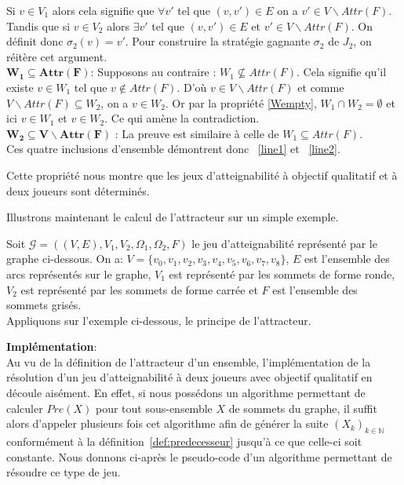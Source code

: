 \begin{demonstration}
		Si $v \in V_1$ alors cela signifie que $\forall v'$ tel que $(v,v') \in E$ on a $v' \in V\backslash Attr(F)$. Tandis que si $v \in V_2$ alors $ \exists v'$ tel que $ (v, v') \in E$ et $ v' \in V\backslash Attr(F)$. On définit donc $\sigma_2(v) = v'$. Pour construire la stratégie gagnante $\sigma_2$ de $J_2$, on réitère cet argument.\\
		
		
		\noindent $\mathbf{W_{1} \subseteq Attr(F)}$: Supposons au contraire : $W_{1} \not\subseteq Attr(F)$. Cela signifie qu'il existe $v \in W_{1}$ tel que $v \notin Attr(F)$. D'où $v \in V\backslash Attr(F)$ et comme $V \backslash Attr(F) \subseteq W_{2}$, on a $v \in W_{2}$. Or par la propriété \ref{Wempty}, $W_{1} \cap W_{2} = \emptyset $ et ici $v \in W_{1}$ et $v \in W_{2}$. Ce qui amène la contradiction.\\
		
		\noindent $\mathbf{W_{2} \subseteq V\backslash Attr(F)}$ : La preuve est similaire à celle de $W_{1} \subseteq Attr(F)$.\\
		
		Ces quatre inclusions d'ensemble démontrent donc ~\eqref{line1} et ~\eqref{line2}.
	\end{demonstration}
	\begin{rem}
		Cette propriété nous montre que les jeux d'atteignabilité à objectif qualitatif et à deux joueurs sont déterminés.
	\end{rem}
	
Illustrons maintenant le calcul de l'attracteur sur un simple exemple.

\begin{exemple}
Soit $\mathcal{G} = ((V,E),V_{1},V_{2},\Omega _{1}, \Omega _{2},F)$ le jeu d'atteignabilité représenté par le graphe ci-dessous. On a: $V = \{ v_{0},v_{1},v_{2},v_{3},v_{4},v_{5},v_{6},v_{7},v_{8} \}$, $E$ est l'ensemble des arcs représentés sur le graphe, $V_{1}$ est représenté par les sommets de forme ronde, $V_{2}$ est représenté par les sommets de forme carrée et $F$ est l'ensemble des sommets grisés.\\
Appliquons sur l'exemple ci-dessous, le principe de l'attracteur.


\FloatBarrier
\end{exemple}

\noindent\textbf{Implémentation}:\\

Au vu de la définition de l'attracteur d'un ensemble, l'implémentation de la résolution d'un jeu d'atteignabilité à deux joueurs avec objectif qualitatif en découle aisément. En effet, si nous possédons un algorithme permettant de calculer $Pre(X)$ pour tout sous-ensemble $X$ de sommets du graphe, il suffit alors d'appeler plusieurs fois cet algorithme afin de générer la suite $(X_k)_{k \in \mathbb{N}}$ conformément à la définition~\ref{def:predecesseur} jusqu'à ce que celle-ci soit constante. Nous donnons ci-après le pseudo-code d'un algorithme permettant de résoudre ce type de jeu. \\

